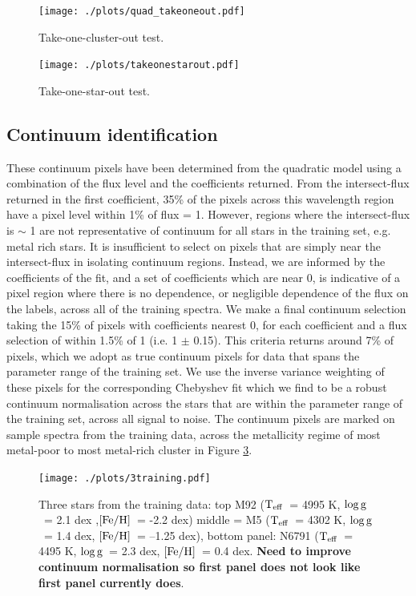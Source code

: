 \documentclass[12pt, preprint]{aastex}
\newcommand{\teff}{\mbox{$\rm T_{eff}$}}
\newcommand{\feh}{\mbox{$\rm [Fe/H]$}}
\newcommand{\logg}{\mbox{$\rm \log g$}}
\begin{document}
\begin{figure}[h!]
\centering
  \texttt{[image: ./plots/quad\_takeoneout.pdf]}
\caption{Take-one-cluster-out test.}
\label{fig:takeoneout}
\end{figure}

\begin{figure}[h!]
\centering
  \texttt{[image: ./plots/takeonestarout.pdf]}
\caption{Take-one-star-out test.}
\label{fig:takeoneout}
\end{figure}


\subsection{Continuum identification}



These continuum pixels have been determined from the quadratic model using a combination of the flux level and the coefficients returned.  From the intersect-flux returned in the first coefficient, 35\% of the pixels across this wavelength region have a pixel level within 1\% of flux = 1. However, regions where the intersect-flux is $\sim$ 1 are not representative of continuum for all stars in the training set, e.g. metal rich stars. It is insufficient to select on pixels that are simply near the intersect-flux in isolating continuum regions. Instead, we are informed by the coefficients of the fit, and a set of coefficients which are near 0, is indicative of a pixel region where there is no dependence, or negligible dependence of the flux on the labels, across all of the training spectra. We make a final continuum selection taking the 15\% of pixels with coefficients nearest 0, for each coefficient and a flux selection of within 1.5\% of 1 (i.e. 1 $\pm$ 0.15). This criteria returns around  7\% of pixels, which we adopt as true continuum pixels for data that spans the parameter range of the training set. We use the inverse variance weighting of these pixels for the corresponding Chebyshev fit which we find to be a robust continuum normalisation across the stars that are within the parameter range of the training set, across all signal to noise. The continuum pixels are marked on sample spectra from the training data, across the metallicity regime of most metal-poor to most metal-rich cluster in Figure \ref{fig:cal_feh}.




\begin{figure}[h!]
  \texttt{[image: ./plots/3training.pdf]}
\caption{Three stars from the training data: top M92 (\teff\ = 4995 K, \logg\ = 2.1 dex ,\feh\, = -2.2 dex) middle = M5 (\teff\ = 4302 K, \logg\ = 1.4 dex, \feh\ = --1.25 dex), bottom panel: N6791 (\teff\  = 4495 K, \logg\ = 2.3 dex, \feh\ = 0.4 dex. \textbf{Need to improve continuum normalisation so first panel does not look like first panel currently does}. }
\label{fig:cal_feh}
\end{figure}
\end{document}
